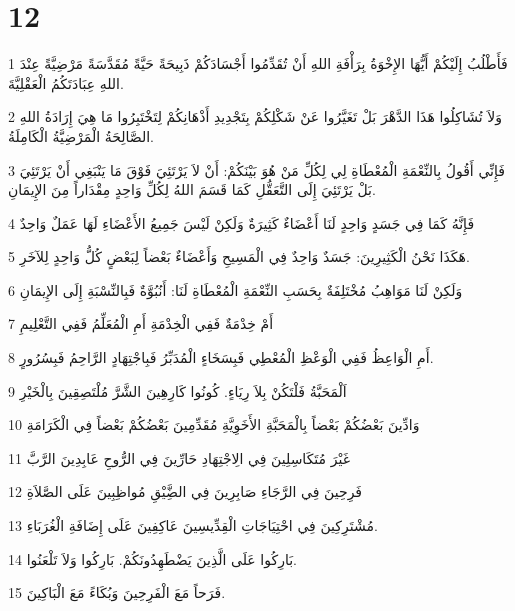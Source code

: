 \chapter{12}

\par 1 فَأَطْلُبُ إِلَيْكُمْ أَيُّهَا الإِخْوَةُ بِرَأْفَةِ اللهِ أَنْ تُقَدِّمُوا أَجْسَادَكُمْ ذَبِيحَةً حَيَّةً مُقَدَّسَةً مَرْضِيَّةً عِنْدَ اللهِ عِبَادَتَكُمُ الْعَقْلِيَّةَ.
\par 2 وَلاَ تُشَاكِلُوا هَذَا الدَّهْرَ بَلْ تَغَيَّرُوا عَنْ شَكْلِكُمْ بِتَجْدِيدِ أَذْهَانِكُمْ لِتَخْتَبِرُوا مَا هِيَ إِرَادَةُ اللهِ الصَّالِحَةُ الْمَرْضِيَّةُ الْكَامِلَةُ.
\par 3 فَإِنِّي أَقُولُ بِالنِّعْمَةِ الْمُعْطَاةِ لِي لِكُلِّ مَنْ هُوَ بَيْنَكُمْ: أَنْ لاَ يَرْتَئِيَ فَوْقَ مَا يَنْبَغِي أَنْ يَرْتَئِيَ بَلْ يَرْتَئِيَ إِلَى التَّعَقُّلِ كَمَا قَسَمَ اللهُ لِكُلِّ وَاحِدٍ مِقْدَاراً مِنَ الإِيمَانِ.
\par 4 فَإِنَّهُ كَمَا فِي جَسَدٍ وَاحِدٍ لَنَا أَعْضَاءٌ كَثِيرَةٌ وَلَكِنْ لَيْسَ جَمِيعُ الأَعْضَاءِ لَهَا عَمَلٌ وَاحِدٌ
\par 5 هَكَذَا نَحْنُ الْكَثِيرِينَ: جَسَدٌ وَاحِدٌ فِي الْمَسِيحِ وَأَعْضَاءٌ بَعْضاً لِبَعْضٍ كُلُّ وَاحِدٍ لِلآخَرِ.
\par 6 وَلَكِنْ لَنَا مَوَاهِبُ مُخْتَلِفَةٌ بِحَسَبِ النِّعْمَةِ الْمُعْطَاةِ لَنَا: أَنُبُوَّةٌ فَبِالنِّسْبَةِ إِلَى الإِيمَانِ
\par 7 أَمْ خِدْمَةٌ فَفِي الْخِدْمَةِ أَمِ الْمُعَلِّمُ فَفِي التَّعْلِيمِ
\par 8 أَمِ الْوَاعِظُ فَفِي الْوَعْظِ الْمُعْطِي فَبِسَخَاءٍ الْمُدَبِّرُ فَبِاجْتِهَادٍ الرَّاحِمُ فَبِسُرُورٍ.
\par 9 اَلْمَحَبَّةُ فَلْتَكُنْ بِلاَ رِيَاءٍ. كُونُوا كَارِهِينَ الشَّرَّ مُلْتَصِقِينَ بِالْخَيْرِ
\par 10 وَادِّينَ بَعْضُكُمْ بَعْضاً بِالْمَحَبَّةِ الأَخَوِيَّةِ مُقَدِّمِينَ بَعْضُكُمْ بَعْضاً فِي الْكَرَامَةِ
\par 11 غَيْرَ مُتَكَاسِلِينَ فِي الِاجْتِهَادِ حَارِّينَ فِي الرُّوحِ عَابِدِينَ الرَّبَّ
\par 12 فَرِحِينَ فِي الرَّجَاءِ صَابِرِينَ فِي الضَِّيْقِ مُواظِبِينَ عَلَى الصَّلاَةِ
\par 13 مُشْتَرِكِينَ فِي احْتِيَاجَاتِ الْقِدِّيسِينَ عَاكِفِينَ عَلَى إِضَافَةِ الْغُرَبَاءِ.
\par 14 بَارِكُوا عَلَى الَّذِينَ يَضْطَهِدُونَكُمْ. بَارِكُوا وَلاَ تَلْعَنُوا.
\par 15 فَرَحاً مَعَ الْفَرِحِينَ وَبُكَاءً مَعَ الْبَاكِينَ.
